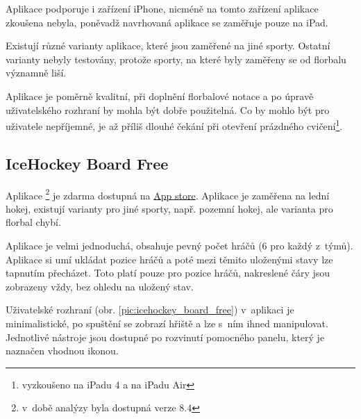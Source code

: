 \documentclass[thesis=B,czech]{FITthesis}[2012/06/26]
\begin{document}
	Aplikace podporuje i zařízení iPhone, nicméně na tomto zařízení aplikace zkoušena nebyla, poněvadž navrhovaná aplikace se zaměřuje pouze na iPad.

	Existují různé varianty aplikace, které jsou zaměřené na jiné sporty. Ostatní varianty nebyly testovány, protože sporty, na které byly zaměřeny se od florbalu významně liší.

	Aplikace je poměrně kvalitní, při doplnění florbalové notace a po úpravě uživatelského rozhraní by mohla být dobře použitelná. Co by mohlo být pro uživatele nepříjemné, je až příliš dlouhé čekání při otevření prázdného cvičení\footnote{vyzkoušeno na iPadu 4 a na iPadu Air}.

	\subsection{IceHockey Board Free \cite{iceHockeyBoardAppstore}}

	Aplikace \footnote{v~době analýzy byla dostupná verze 8.4} je zdarma dostupná na \href{https://itunes.apple.com/ca/app/icehockey-board-free/id366079177?mt=8}{App store}. Aplikace je zaměřena na lední hokej, existují varianty pro jiné sporty, např. pozemní hokej, ale varianta pro florbal chybí.

	Aplikace je velmi jednoduchá, obsahuje pevný počet hráčů (6 pro každý z~týmů). Aplikace si umí ukládat pozice hráčů a poté mezi těmito uloženými stavy lze tapnutím přecházet. Toto platí pouze pro pozice hráčů, nakreslené čáry jsou zobrazeny vždy, bez ohledu na uložený stav.

	Uživatelské rozhraní (obr. \ref{pic:icehockey_board_free}) v~aplikaci je minimalistické, po spuštění se zobrazí hřiště a lze s~ním ihned manipulovat. Jednotlivé nástroje jsou dostupné po rozvinutí pomocného panelu, který je naznačen vhodnou ikonou.
\end{document}
